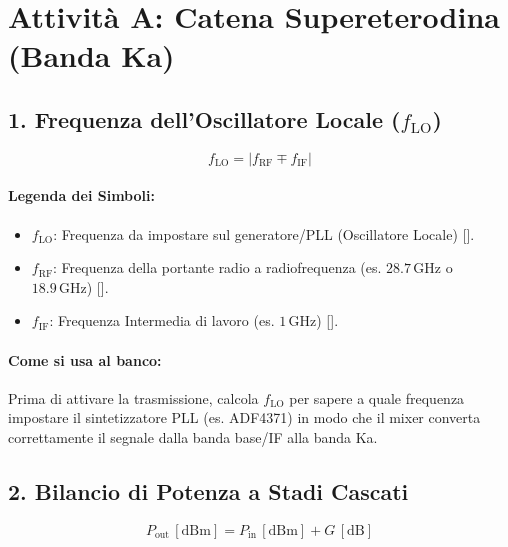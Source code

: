 \documentclass[openany,a4paper,12pt]{book}
\begin{document}
\section{Attività A: Catena Supereterodina (Banda Ka)}

\subsection{1. Frequenza dell'Oscillatore Locale ($f_{\text{LO}}$)}

\begin{tcolorbox}[title=Formula per il Mixer]
\[
f_{\text{LO}} = |f_{\text{RF}} \mp f_{\text{IF}}|
\]
\end{tcolorbox}

\paragraph{Legenda dei Simboli:}
\begin{itemize}
    \item $f_{\text{LO}}$: Frequenza da impostare sul generatore/PLL (Oscillatore Locale) [].
    \item $f_{\text{RF}}$: Frequenza della portante radio a radiofrequenza (es. $28.7\,\text{GHz}$ o $18.9\,\text{GHz}$) [].
    \item $f_{\text{IF}}$: Frequenza Intermedia di lavoro (es. $1\,\text{GHz}$) [].
\end{itemize}

\paragraph{Come si usa al banco:}
Prima di attivare la trasmissione, calcola $f_{\text{LO}}$ per sapere a quale frequenza impostare il sintetizzatore PLL (es. ADF4371) in modo che il mixer converta correttamente il segnale dalla banda base/IF alla banda Ka.

\subsection{2. Bilancio di Potenza a Stadi Cascati}

\begin{tcolorbox}[title=Formula per la Potenza d'Uscita dello Stadio]
\[
P_{\text{out}} \, [\text{dBm}] = P_{\text{in}} \, [\text{dBm}] + G \, [\text{dB}]
\]
\end{tcolorbox}
\end{document}
